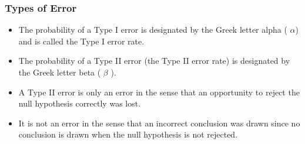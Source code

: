 \begin{frame}
\frametitle{Types of Error}
\begin{itemize}
\item The probability of a Type I error is designated by the Greek letter alpha ( $\alpha$) and is called the Type I error rate.
\item The probability of a Type II error (the Type II error rate) is designated by the Greek letter beta ( $\beta$ ).
\item A Type II error is only an error in the sense that an opportunity to reject the null hypothesis correctly was lost.
\item It is not an error in the sense that an incorrect conclusion was drawn since no conclusion is drawn when the null hypothesis is not rejected.
\end{itemize}
\end{frame}




